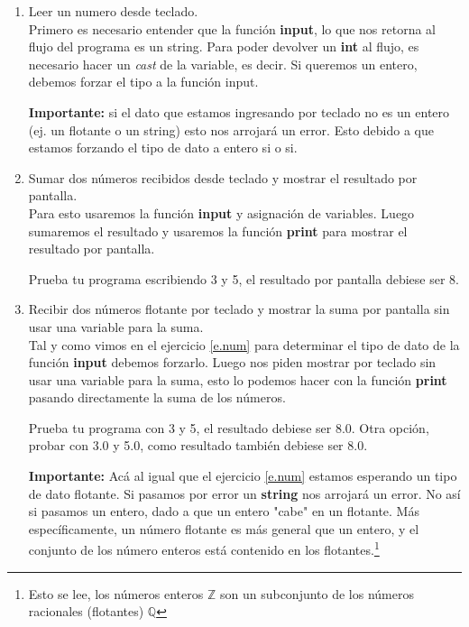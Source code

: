 \begin{enumerate}[{Ejercicio} 1.]
        \item Leer un numero desde teclado.\label{e.num} \\
        
        \asw Primero es necesario entender que la función \textbf{input}, lo que nos retorna al flujo del programa es un string. Para poder devolver un \textbf{int} al flujo, es necesario hacer un \textit{cast} de la variable, es decir. Si queremos un entero, debemos forzar el tipo a la función input.\\


        \textbf{Importante:} si el dato que estamos ingresando por teclado no es un entero (ej. un flotante o un string) esto nos arrojará un error. Esto debido a que estamos forzando el tipo de dato a entero si o si.

        \item Sumar dos números recibidos desde teclado y mostrar el resultado por pantalla.\\
        
        \asw Para esto usaremos la función \textbf{input} y asignación de variables. Luego sumaremos el resultado y usaremos la función \textbf{print} para mostrar el resultado por pantalla.\\


        Prueba tu programa escribiendo 3 y 5, el resultado por pantalla debiese ser 8.

        \item Recibir dos números flotante por teclado y mostrar la suma por pantalla sin usar una variable para la suma.\\
        
        \asw Tal y como vimos en el ejercicio \ref{e.num} para determinar el tipo de dato de la función \textbf{input} debemos forzarlo. Luego nos piden mostrar por teclado sin usar una variable para la suma, esto lo podemos hacer con la función \textbf{print} pasando directamente la suma de los números.\\


        Prueba tu programa con 3 y 5, el resultado debiese ser 8.0. Otra opción, probar con 3.0 y 5.0, como resultado también debiese ser 8.0.

        \textbf{Importante:} Acá al igual que el ejercicio \ref{e.num} estamos esperando un tipo de dato flotante. Si pasamos por error un \textbf{string} nos arrojará un error. No así si pasamos un entero, dado a que un entero "cabe" en un flotante. Más específicamente, un número flotante es más general que un entero, y el conjunto de los número enteros está contenido en los flotantes.\footnote{Esto se lee, los números enteros \(\mathbb{Z}\) son un subconjunto de los números racionales (flotantes) \(\mathbb{Q}\)}


\end{enumerate}
